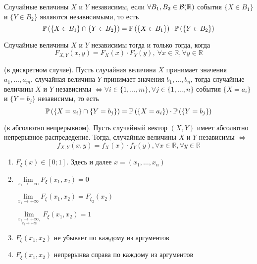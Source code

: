 \documentclass{article}
\begin{document}
 Случайные величины $X$ и $Y$ независимы, если $\forall B_1,B_2\in\mathcal{B}(\mathbb{R})$ события $\{X\in B_1\}$ и $\{Y\in B_2\}$ являются независимыми, то есть
\begin{equation*}
    \mathbb{P}\left(\{X\in B_1\}\cap\{Y\in B_2\}\right)=\mathbb{P}\left(\{X\in B_1\}\right)\cdot\mathbb{P}\left(\{Y\in B_2\}\right)
\end{equation*}

\theorem Случайные величины $X$ и $Y$ независимы тогда и только тогда, когда
\begin{equation*}
    F_{X,Y}(x,y)=F_{X}(x)\cdot F_{Y}(y),\ \forall x\in\mathbb{R},\forall y\in\mathbb{R}
\end{equation*}

\theorem (в дискретном случае). Пусть случайная величина $X$ принимает значения $a_1,\ldots,a_m$, случайная величина $Y$ принимает значения $b_1,\ldots,b_n$, тогда случайные величины $X$ и $Y$ независимы $\Longleftrightarrow \forall i\in\{1,\ldots,m\},\forall j\in\{1,\ldots,n\}$ события $\{X=a_i\}$ и $\{Y=b_j\}$ независимы, то есть
\begin{equation*}
    \mathbb{P}\left(\{X=a_i\}\cap\{Y=b_j\}\right)=\mathbb{P}\left(\{X=a_i\}\right)\cdot\mathbb{P}\left(\{Y=b_j\}\right)
\end{equation*}

\theorem (в абсолютно непрерывном). Пусть случайный вектор $(X,Y)$ имеет абсолютно непрерывное распредедение. Тогда, случайные величины $X$ и $Y$ независимы $\Longleftrightarrow$
\begin{equation*}
    f_{X,Y}(x,y)=f_X(x)\cdot f_{Y}(y),\forall x\in\mathbb{R},\forall y\in\mathbb{R}
\end{equation*}

\theorem
\begin{enumerate}
    \item $F_{\xi}(x)\in[0;1]$. Здесь и далее $x=(x_1,\ldots,x_n)$
    \item $\lim\limits_{x_1\rightarrow-\infty}F_{\xi}(x_1,x_2)=0$
    
    $\lim\limits_{x_1\rightarrow+\infty}F_{\xi}(x_1,x_2)=F_{\xi_2}(x_2)$

    $\lim\limits_{\underset{x_2\rightarrow+\infty}{x_1\rightarrow+\infty,}}F_{\xi}(x_1,x_2)=1$
    \item $F_{\xi}(x_1,x_2)$ не убывает по каждому из аргументов
    \item $F_{\xi}(x_1,x_2)$ непрерынва справа по каждому из аргументов
\end{enumerate}
\end{document}
